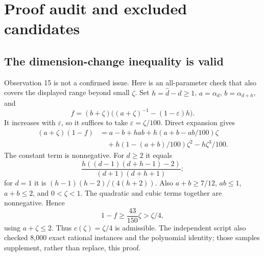 \documentclass[10pt]{article}
\begin{document}
\section*{Proof audit and excluded candidates}
\subsection*{The dimension-change inequality is valid}
Observation 15 is not a confirmed issue. Here is an all-parameter check that also covers the displayed range beyond small \(\zeta\). Set \(h=\widehat d-d\ge1\), \(a=\alpha_d\), \(b=\alpha_{d+h}\), and \[f=(b+\zeta)\bigl((a+\zeta)^{-1}-(1-\varepsilon)h\bigr).\] It increases with \(\varepsilon\), so it suffices to take \(\varepsilon=\zeta/100\). Direct expansion gives \[\begin{aligned}
 (a+\zeta)(1-f)
 &=a-b+hab+h(a+b-ab/100)\zeta\\
 &\quad+h(1-(a+b)/100)\zeta^2-h\zeta^3/100.\end{aligned}\] The constant term is nonnegative. For \(d\ge2\) it equals \[\frac{h((d-1)(d+h-1)-2)}{(d+1)(d+h+1)};\] for \(d=1\) it is \((h-1)(h-2)/(4(h+2))\). Also \(a+b\ge7/12\), \(ab\le1\), \(a+b\le2\), and \(0<\zeta<1\). The quadratic and cubic terms together are nonnegative. Hence \[1-f\ge \frac{43}{150}\zeta>\zeta/4,\] using \(a+\zeta\le2\). Thus \(c(\zeta)=\zeta/4\) is admissible. The independent script also checked 8,000 exact rational instances and the polynomial identity; those samples supplement, rather than replace, this proof.\par
\end{document}
